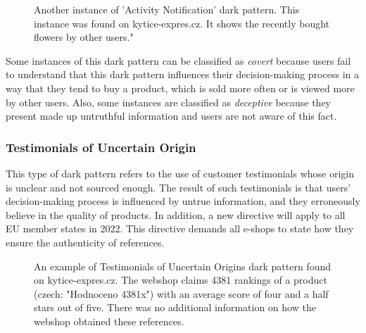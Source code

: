 \begin{figure}[ht]
\begin{minipage}[ht]{0.40\linewidth}
                \caption{Another instance of 'Activity Notification' dark pattern. This instance was found on kytice-expres.cz. It shows the recently bought flowers by other users."}
                \label{fig:pressured-selling-czc}
            \end{minipage}
        \end{figure}

        Some instances of this dark pattern can be classified as \emph{covert} because users fail to understand that this dark pattern influences their decision-making process in a way that they tend to buy a product, which is sold more often or is viewed more by other users. Also, some instances are classified as \emph{deceptive} because they present made up untruthful information and users are not aware of this fact.

        \subsubsection{Testimonials of Uncertain Origin}
        This type of dark pattern refers to the use of customer testimonials whose origin is unclear and not sourced enough. The result of such testimonials is that users' decision-making process is influenced by untrue information, and they erroneously believe in the quality of products. In addition, a new directive will apply to all EU member states in 2022. This directive demands all e-shops to state how they ensure the authenticity of references\cite{penize-testimonials}.
        
        \begin{figure}[ht]
            \centering
            \caption{An example of Testimonials of Uncertain Origins dark pattern found on kytice-expres.cz. The webshop claims 4381 rankings of a product (czech: "Hodnoceno 4381x") with an average score of four and a half stars out of five. There was no additional information on how the webshop obtained these references.}
            \label{fig:testimonials-kytice-expres}
        \end{figure}

